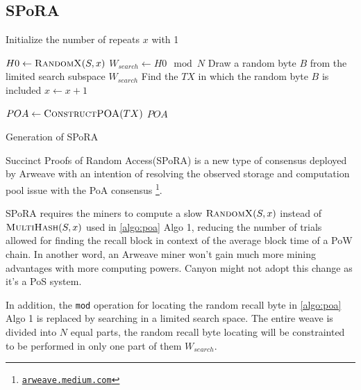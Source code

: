 \documentclass[]{article}
\begin{document}
\subsection{SPoRA}

\IncMargin{1em}
\begin{algorithm}
    \label{algo:spora}

    \SetAlgoNoLine

    \BlankLine

    Initialize the number of repeats $x$ with 1\;
    \BlankLine

    \Repeat
        {}
        {
        $H0 \leftarrow \Call{RandomX}{S, x}$\;
        $W_{search} \leftarrow H0 \mod N$\;
        Draw a random byte $B$ from the limited search subspace $W_{search}$\;
        Find the $TX$ in which the random byte $B$ is included\;
        {$x \leftarrow x + 1$}\;
    }

    \BlankLine
    $POA \leftarrow \Call{ConstructPOA}{TX}$\;
    \Return $POA$\;
    \caption{Generation of SPoRA}
\end{algorithm}
\DecMargin{1em}

Succinct Proofs of Random Access(SPoRA) is a new type of consensus deployed by Arweave with an intention of resolving the observed storage and computation pool issue with the PoA consensus \footnote{\href{https://arweave.medium.com/the-arweave-network-is-now-running-succinct-random-proofs-of-access-spora-e2732cbcbb46}{\nolinkurl{arweave.medium.com}}}.

SPoRA requires the miners to compute a slow $\Call{RandomX}{S, x}$ instead of $\Call{MultiHash}{S, x}$ used in \ref{algo:poa}{ Algo 1}, reducing the number of trials allowed for finding the recall block in context of the average block time of a PoW chain. In another word, an Arweave miner won't gain much more mining advantages with more computing powers. Canyon might not adopt this change as it's a PoS system.

In addition, the \texttt{mod} operation for locating the random recall byte in \ref{algo:poa}{ Algo 1} is replaced by searching in a limited search space. The entire weave is divided into $N$ equal parts, the random recall byte locating will be constrainted to be performed in only one part of them $W_{search}$.
\end{document}
